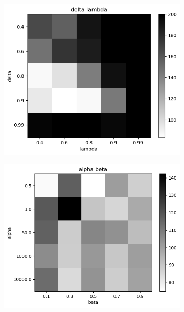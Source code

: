 \documentclass{article}
\begin{document}
\begin{figure}[h]
	\centering
	\begin{subfigure}[t]{0.28\linewidth}
		\centering
		\includegraphics[width = 1.0\linewidth, trim={0 0 0 0}, clip=true]{figures/real_delta_lambda_heat.png}
		\label{fig:comp1el}	
	\end{subfigure}%
	\hspace{0.1\linewidth}
	\begin{subfigure}[t]{0.28\linewidth}
		\centering
		\includegraphics[width = 1.0\linewidth, trim={0 0 0 0}, clip=true]{figures/test_alpha_beta_heat.png}

\end{subfigure}
\end{figure}
\end{document}
